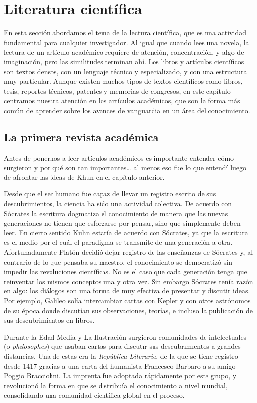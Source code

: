 \chapter{Literatura científica}
\label{cha:literaturacientifica}

En esta sección abordamos el tema de la lectura científica, que es una actividad
fundamental para cualquier investigador.
Al igual que cuando lees una novela, la lectura de un artículo académico
requiere de atención, concentración, y algo de imaginación, pero las similitudes
terminan ahí.
Los libros y artículos científicos son textos densos, con un lenguaje técnico y
especializado, y con una estructura muy particular.
Aunque existen muchos tipos de textos científicos como libros, tesis, reportes
técnicos, patentes y memorias de congresos, en este capítulo centramos nuestra
atención en los artículos académicos, que son la forma más común de aprender
sobre los avances de vanguardia en un área del conocimiento.

\section{La primera revista académica}
\label{sec:contexto}
Antes de ponernos a leer artículos académicos es importante entender cómo
surgieron y por qué son tan importantes… al menos eso fue lo que entendí luego
de afrontar las ideas de Khun en el capítulo anterior.

Desde que el ser humano fue capaz de llevar un registro escrito de sus
descubrimientos, la ciencia ha sido una actividad colectiva.
De acuerdo con Sócrates la escritura dogmatiza el conocimiento de manera que las
nuevas generaciones no tienen que esforzarse por pensar, sino que simplemente
deben leer.
En cierto sentido Kuhn estaría de acuerdo con Sócrates, ya que la escritura
es el medio por el cuál el paradigma se transmite de una generación a otra.
Afortunadamente Platón decidió dejar registro de las enseñanzas de Sócrates y,
al contrario de lo que pensaba su maestro, el conocimiento se democratizó sin
impedir las revoluciones científicas.
No es el caso que cada generación tenga que reinventar los mismos conceptos una
y otra vez.
Sin embargo Sócrates tenía razón en algo: los diálogos son una forma de
muy efectiva de presentar y discutir ideas.
Por ejemplo, Galileo solía intercambiar cartas con Kepler y con otros astrónomos
de su época donde discutían sus observaciones, teorías, e incluso la publicación
de sus descubrimientos en libros.

Durante la Edad Media y La Ilustración surgieron comunidades de intelectuales (o
\emph{philosophes}) que usaban cartas para discutir sus descubrimientos a
grandes distancias.
Una de estas era la \emph{República Literaria}, de la que se tiene registro
desde 1417 gracias a una carta del humanista Francesco Barbaro a su amigo Poggio
Bracciolini.
La imprenta fue adoptada rápidamente por este grupo, y revolucionó la forma en
que se distribuía el conocimiento a nivel mundial, consolidando una comunidad
científica global en el proceso.

